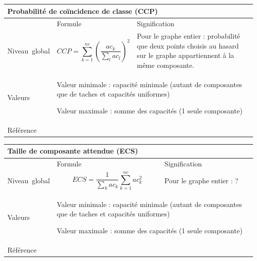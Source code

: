 \documentclass{article}
\begin{document}
\begin{table}[H]
\begin{tabular}{|m{3.24cm}|m{4.4810004cm}m{7.924cm}|}

\hline
\multicolumn{3}{|m{16.044998cm}|}{Probabilité de coïncidence de classe (CCP)}\\\hline
 &
\multicolumn{1}{m{4.4810004cm}|}{Formule} &
Signification\\\hline
Niveau~global &
\multicolumn{1}{m{4.4810004cm}|}{\begin{equation*}
\mathit{CCP}=\sum _{k=1}^{\mathit{nc}}{{\left(\frac{{\mathit{ac}}_{k}}{\sum _{l}{{\mathit{ac}}_{l}}}\right)}^{2}}
\end{equation*}
} &
Pour le graphe entier : probabilité que deux points choisis au hasard sur le graphe appartiennent à la même composante.

\\\hline
Valeurs &
\multicolumn{2}{m{12.6050005cm}|}{Valeur minimale : capacité minimale (autant de composantes que de taches et capacités uniformes)

Valeur maximale : somme des capacités (1 seule composante)

}\\\hline
Référence &
\multicolumn{2}{m{12.6050005cm}|}{\cite{Pascual2006}}\\\hline
\end{tabular}
\end{table}


\begin{table}[H]
\begin{tabular}{|m{3.24cm}|m{4.4810004cm}m{7.924cm}|}

\hline
\multicolumn{3}{|m{16.044998cm}|}{Taille de composante attendue (ECS)}\\\hline
 &
\multicolumn{1}{m{4.4810004cm}|}{Formule} &
Signification\\\hline
Niveau~global &
\multicolumn{1}{m{4.4810004cm}|}{\begin{equation*}
\mathit{ECS}=\frac{1}{\sum _{k}{{\mathit{ac}}_{k}}}\sum _{k=1}^{\mathit{nc}}{{{\mathit{ac}}_{k}^{2}}}
\end{equation*}
} &
Pour le graphe entier : ?

\\\hline
Valeurs &
\multicolumn{2}{m{12.6050005cm}|}{Valeur minimale : capacité minimale (autant de composantes que de taches et capacités uniformes)

Valeur maximale : somme des capacités (1 seule composante)

}\\\hline
Référence &
\multicolumn{2}{m{12.6050005cm}|}{\cite{OBrien2006}}\\\hline
\end{tabular}
\end{table}
\end{document}
